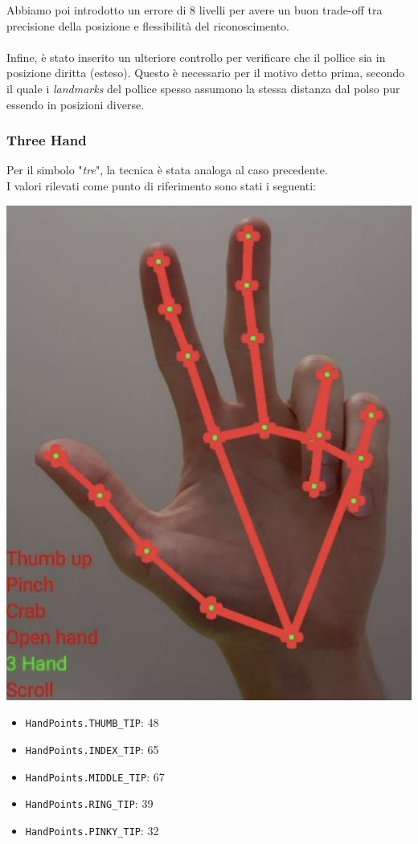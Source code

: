 \noindent Abbiamo poi introdotto un errore di 8 livelli per avere un buon trade-off tra precisione della posizione e flessibilità del riconoscimento.\\
\\
\noindent Infine, è stato inserito un ulteriore controllo per verificare che il pollice sia in posizione diritta (esteso). Questo è necessario per il motivo detto prima, secondo il quale i \textit{landmarks} del pollice spesso assumono la stessa distanza dal polso pur essendo in posizioni diverse.

\newpage
\subsubsection{Three Hand}
Per il simbolo "\textit{tre}", la tecnica è stata analoga al caso precedente.\\
I valori rilevati come punto di riferimento sono stati i seguenti:
\begin{multicols}{2}
    \begin{multicolfigure}
        \centering
        \includegraphics[width=\textwidth]{images/three_hand.png}
    \end{multicolfigure}
    \columnbreak
    \begin{itemize}
        \item \texttt{HandPoints.THUMB\_TIP}: 48
        \item \texttt{HandPoints.INDEX\_TIP}: 65
        \item \texttt{HandPoints.MIDDLE\_TIP}: 67
        \item \texttt{HandPoints.RING\_TIP}: 39
        \item \texttt{HandPoints.PINKY\_TIP}: 32
    \end{itemize} 
\end{multicols}
